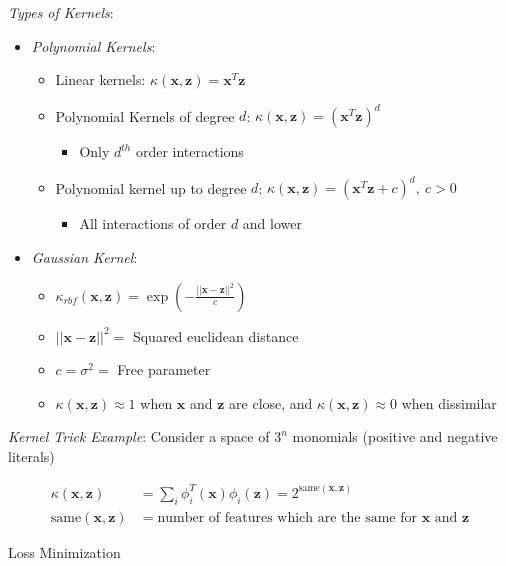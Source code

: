 \documentclass{article}
\newcommand{\Norm}[1]{\left|\left| #1\right|\right|}
\begin{document}
{\em Types of Kernels}:
\begin{itemize}
\item {\em Polynomial Kernels}:
\begin{itemize}
\item Linear kernels: $\kappa(\mathbf{x},\mathbf{z}) = \mathbf{x}^{T}\mathbf{z}$
\item Polynomial Kernels of degree $d$: $\kappa(\mathbf{x},\mathbf{z}) = (\mathbf{x}^{T}\mathbf{z})^{d}$
\begin{itemize}
\item Only $d^{th}$ order interactions
\end{itemize}
\item Polynomial kernel up to degree $d$: $\kappa(\mathbf{x},\mathbf{z})=(\mathbf{x}^{T}\mathbf{z}+c)^{d},\ c>0$
\begin{itemize}
\item All interactions of order $d$ and lower
\end{itemize}
\end{itemize}
\item {\em Gaussian Kernel}:
\begin{itemize}
\item $\kappa_{rbf}(\mathbf{x},\mathbf{z}) = \exp\left(-\frac{\Norm{\mathbf{x}-\mathbf{z}}^{2}}{c}\right)$
\item $\Norm{\mathbf{x}-\mathbf{z}}^{2}=$ Squared euclidean distance
\item $c = \sigma^{2} = $ Free parameter
\item $\kappa(\mathbf{x},\mathbf{z})\approx 1$ when $\mathbf{x}$ and $\mathbf{z}$ are close, and $\kappa(\mathbf{x},\mathbf{z})\approx 0$ when dissimilar
\end{itemize}
\end{itemize}

{\em Kernel Trick Example}: Consider a space of $3^{n}$ monomials (positive and negative literals)

\begin{align}
\kappa(\mathbf{x},\mathbf{z}) &= \sum_{i}\phi_{i}^{T}(\mathbf{x})\phi_{i}(\mathbf{z}) = 2^{\text{same}(\mathbf{x},\mathbf{z})}\\
\text{same}(\mathbf{x},\mathbf{z}) &= \text{number of features which are the same for $\mathbf{x}$ and $\mathbf{z}$}
\end{align}

{\large Loss Minimization}
\end{document}
